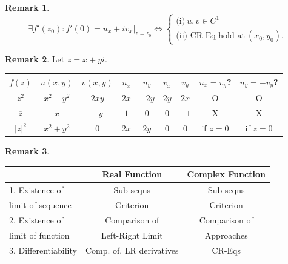 \documentclass[12pt,openany]{book}
\theoremstyle{definition}
\newtheorem{remark}{Remark}[section]
\newcommand{\abs}[1]{\left\lvert #1 \right\rvert}
\newcommand{\conjugate}[1]{\overline{#1}}
\begin{document}
	\begin{remark}
		\[\exists f'(z_0):f'(0)=u_x+iv_x\bigg|_{z=z_0}\iff\begin{cases}
		\text{(i)}\ u,v\in C^1\\
		\text{(ii) CR-Eq hold at}\ (x_0,y_0).
		\end{cases}\]
	\end{remark}
	\vspace{8pt}
	\begin{remark}
		Let $z=x+yi$. \begin{table}[h!]
			\centering
			\begin{tabular}{@{}c||cc|cc|cc||cc@{}}
				\toprule
				$f(z)$ & $u(x,y)$ & $v(x,y)$ & $u_x$ & $u_y$ & $v_x$ & $v_y$ & $u_x=v_y$? &$u_y=-v_y$?\\
				\midrule
				$z^2$ & $x^2-y^2$ & $2xy$ & $2x$ & $-2y$ & $2y$ & $2x$ & O & O\\
				\addlinespace
				$\conjugate{z}$ & $x$ & $-y$ & $1$ & $0$ & $0$ & $-1$ & X & X\\
				\addlinespace
				$\abs{z}^2$ & $x^2+y^2$ & $0$ & $2x$ & $2y$ & $0$ & $0$ & if $z=0$ & if $z=0$\\
				\bottomrule
			\end{tabular}
		\end{table}
	\end{remark}
	\vspace{8pt}
	\begin{remark}
		\ \begin{table}[h!]
			\centering
			\begin{tabular}{@{}l||c|c@{}}
				\toprule
				& \textbf{Real Function} & \textbf{Complex Function} \\
				\midrule
				1. Existence of & Sub-seqns & Sub-seqns\\
				limit of sequence & Criterion & Criterion \\
				\hline%
				2. Existence of & Comparison of & Comparison of \\
				limit of function & Left-Right Limit & Approaches \\
				\hline%
				3. Differentiability & Comp. of. LR derivatives & CR-Eqs \\
				\bottomrule
			\end{tabular}
		\end{table}
	\end{remark}
	\vspace{8pt}
\end{document}
